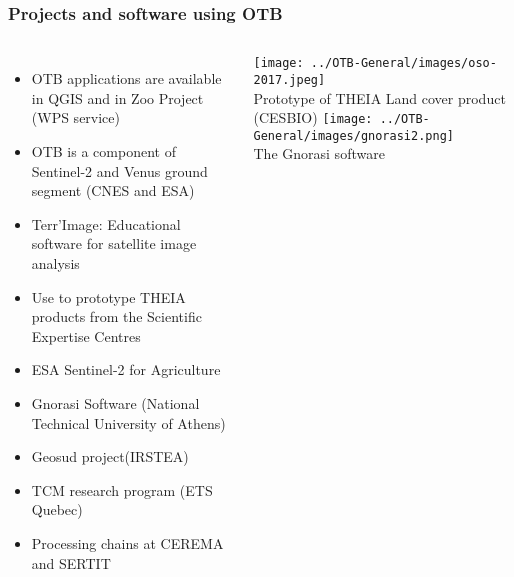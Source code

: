 \begin{frame}
  \frametitle{Projects and software using OTB}
  \vspace{-0.5cm}
  \begin{columns}
    \begin{itemize}
    \item OTB applications are available in QGIS and in Zoo Project (WPS service)
    \item OTB is a component of \alert{Sentinel-2} and Venus ground segment (CNES and ESA)
    \item Terr'Image: Educational software for satellite image analysis
    \item Use to prototype \alert{THEIA} products from the Scientific Expertise Centres
    \item ESA Sentinel-2 for Agriculture
    \item Gnorasi Software (National Technical University of Athens)
    \item Geosud project(IRSTEA)
    \item TCM research program (ETS Quebec)
    \item Processing chains at CEREMA and SERTIT
    \end{itemize}
    \begin{center}
      \texttt{[image: ../OTB-General/images/oso-2017.jpeg]}\\
      \tiny{Prototype of THEIA Land cover product (CESBIO)}
      \texttt{[image: ../OTB-General/images/gnorasi2.png]}\\
      \tiny{The Gnorasi software}
    \end{center}
  \end{columns}
\end{frame}

